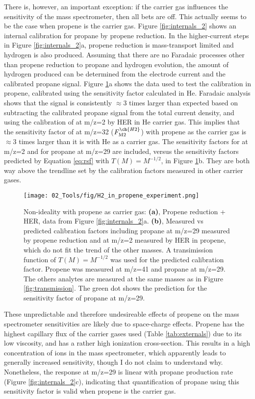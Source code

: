 There is, however, an important exception: if the carrier gas influences the sensitivity of the mass spectrometer, then all bets are off. This actually seems to be the case when propene is the carrier gas. Figure \ref{fig:internals_2} shows an internal calibration for propane by propene reduction. In the higher-current steps in Figure \ref{fig:internals_2}a, propene reduction is mass-transport limited and hydrogen is also produced. Assuming that there are no Faradaic processes other than propene reduction to propane and hydrogen evolution, the amount of hydrogen produced can be determined from the electrode current and the calibrated propane signal. Figure \ref{fig:propene_transmission}a shows the data used to test the  calibration in propene, calibrated using the  sensitivity factor calculated in He. Faradaic analysis shows that the  signal is consistently $\approx 3$ times larger than expected based on subtracting the calibrated propane signal from the total current density, and using the calibration of  at m/z=2 by HER in He carrier gas. This implies that the sensitivity factor of  at m/z=32 ($F_\text{M2}^{\ch{H2}}$) with propene as the carrier gas is $\approx 3$ times larger than it is with He as a carrier gas. The sensitivity factors for  at m/z=2 and for propane at m/z=29 are included, versus the sensitivity factors predicted by Equation \ref{eq:rsf} with $T(M)=M^{-1/2}$, in Figure \ref{fig:propene_transmission}b. They are both way above the trendline set by the calibration factors measured in other carrier gases.
\begin{figure}[b!]
	\texttt{[image: 02\_Tools/fig/H2\_in\_propene\_experiment.png]}
	\caption{Non-ideality with propene as carrier gas: \textbf{(a)}, Propene reduction + HER, data from Figure \ref{fig:internals_2}a. \textbf{(b)}, Measured vs predicted calibration factors including propane at m/z=29 measured by propene reduction and  at m/z=2 measured by HER in propene, which do not fit the trend of the other masses. A transimission function of $T(M) = M^{-1/2}$ was used for the predicted calibration factor. Propene was measured at m/z=41 and propane at m/z=29. The others analytes are measured at the same masses as in Figure \ref{fig:transmission}. The green dot shows the prediction for the sensitivity factor of propane at m/z=29.}
	\label{fig:propene_transmission}
\end{figure}

These unpredictable and therefore undesireable effects of propene on the mass spectrometer sensitivities are likely due to space-charge effects. Propene has the highest capillary flux of the carrier gases used (Table \ref{tab:externals}) due to its low viscosity, and has a rather high ionization cross-section. This results in a high concentration of ions in the mass spectrometer, which apparently leads to generally increased sensitivity, though I do not claim to understand why. Nonetheless, the response at m/z=29 is linear with propane production rate (Figure \ref{fig:internals_2}c), indicating that quantification of propane using this sensitivity factor is valid when propene is the carrier gas.


